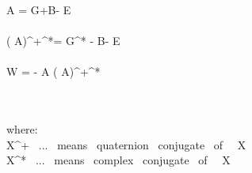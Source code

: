 \widehat{ \Box } \widehat A = G+\vec B-\imath{} \vec E \\\\

(\widehat{ \Box } \widehat A)^+^*= G^* - \vec B-\imath{} \vec E \\\\

\widehat W =  -  \widehat{ \Box } \widehat A (\widehat{ \Box } \widehat A)^+^*


\\\\

where: 
\\
\widehat X^+ \ ... \ means \ quaternion \ conjugate \ of \ \widehat \ X
\\
\widehat X^* \ ...  \ means \ complex \ conjugate \ of \ \widehat \ X  


